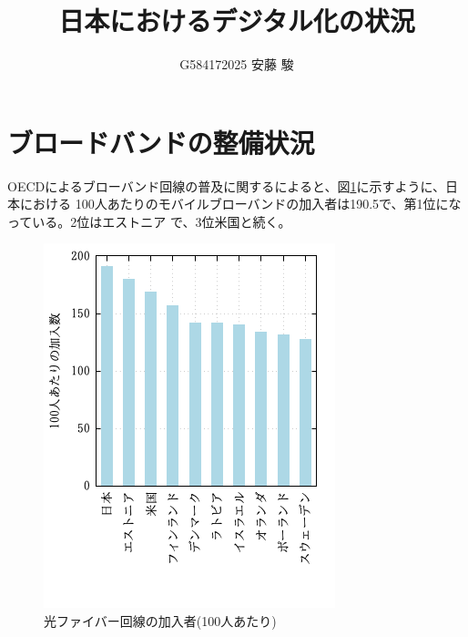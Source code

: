 \documentclass[a4paper,11pt,dvipdfmx]{ujarticle}
\title{日本におけるデジタル化の状況}
\author{G584172025 安藤 駿}
\begin{document}
     
\maketitle %

\section{ブロードバンドの整備状況}


OECDによるブローバンド回線の普及に関する\cite{OECD}によると、図\ref{hyou}に示すように、日本における
100人あたりのモバイルブローバンドの加入者は190.5で、第1位になっている。2位はエストニア
で、3位米国と続く。

\begin{figure}[htbp]
    \label{hyou}
    \includegraphics{fig21.png}
    \caption{光ファイバー回線の加入者(100人あたり)}
     \centering
\end{figure}
\end{document}
